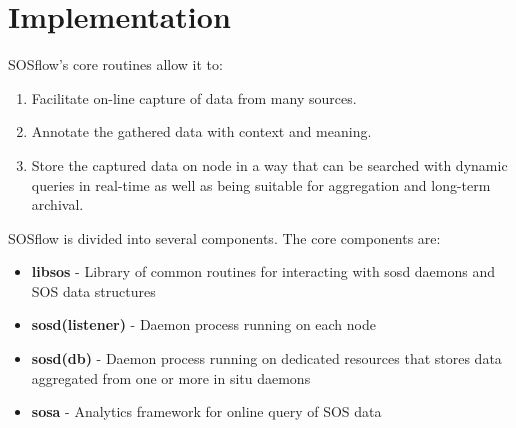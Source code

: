 \section{Implementation}
SOSflow's core routines allow it to:
%
\begin{enumerate}
    \item Facilitate on-line capture of data from many sources.
    \item Annotate the gathered data with context and meaning.
    \item Store the captured data on node in a way that can be
      searched with dynamic queries in real-time as well as being
      suitable for aggregation and long-term archival.
\end{enumerate}
SOSflow is divided into several components.  The core components are:
%
\begin{itemize}
    \item \textbf{libsos} - Library of common routines for interacting with
      sosd daemons and SOS data structures
    \item \textbf{sosd(listener)} - Daemon process running on each node
    \item \textbf{sosd(db)} - Daemon process running on dedicated resources
      that stores data aggregated from one or more in situ daemons
    \item \textbf{sosa} - Analytics framework for online query of SOS data
\end{itemize}

